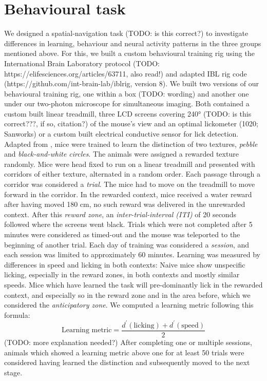 \section{Behavioural task}
We designed a spatial-navigation task (TODO: is this correct?) to investigate differences in learning, behaviour and neural activity patterns in the three groups mentioned above.
For this, we built a custom behavioural training rig using the International Brain Laboratory protocol (TODO: https://elifesciences.org/articles/63711, also read!) and adapted IBL rig code (https://github.com/int-brain-lab/iblrig, version 8).
We built two versions of our behavioural training rig, one within a box (TODO: wording) and another one under our two-photon microscope for simultaneous imaging.
Both contained a custom built linear treadmill, three LCD screens covering 240° (TODO: is this correct???, if so, citation?) of the mouse's view and an optimal lickometer (1020; Sanworks) or a custom built electrical conductive sensor for lick detection.
Adapted from \cite{Sun2021}, mice were trained to learn the distinction of two textures, \textit{pebble} and \textit{black-and-white circles}. The animals were assigned a rewarded texture randomly.  Mice were head fixed to run on a linear treadmill and presented with corridors of either texture, alternated in a random order. Each passage through a corridor was considered a \textit{trial}. The mice had to move on the treadmill to move forward in the corridor. In the rewarded context, mice received a water reward after having moved 180 cm, no such reward was delivered in the unrewarded context. After this \textit{reward zone}, an \textit{inter-trial-interval (ITI)} of 20 seconds followed where the screens went black. Trials which were not completed after 5 minutes were considered as timed-out and the mouse was teleported to the beginning of another trial. Each day of training was considered a \textit{session}, and each session was limited to approximately 60 minutes.
Learning was measured by differences in speed and licking in both contexts: Naive mice show unspecific licking, especially in the reward zones, in both contexts and mostly similar speeds. Mice which have learned the task will pre-dominantly lick in the rewarded context, and especially so in the reward zone and in the area before, which we considered the \textit{anticipatory zone}.
We computed a learning metric following this formula:
\begin{equation}
\text{Learning metric} = \frac{d^{\prime}(\text{licking}) + d^{\prime}(\text{speed})}{2}
\end{equation}
(TODO: more explanation needed?)
After completing one or multiple sessions, animals which showed a learning metric above one for at least 50 trials were considered having learned the distinction and subsequently moved to the next stage.
